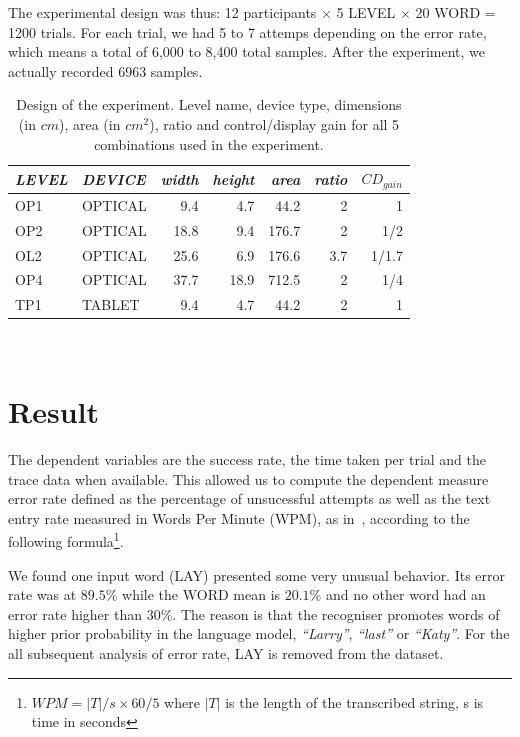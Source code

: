 \documentclass{chi-ext}
\newcommand{\smit}[1]{{\small\textit{{#1}}}}
\newcommand{\cdt}[1]{{\small\uppercase{{#1}}}}
\begin{document}
The experimental design was thus: 12 participants $\times$ 5 \cdt{level} $\times$ 20 \cdt{word} = 1200 trials. For each trial, we had 5 to 7 attemps depending on the error rate, which means a total of 6,000 to 8,400 total samples. After the experiment, we actually recorded 6963 samples.

\begin{table}
  \centering
  \begin{tabular}{l l | r r r r r}
    \smit{LEVEL} & \smit{DEVICE} & \smit{width} & \smit{height} & \smit{area}& \smit{ratio} & \smit{$CD_{gain}$} \\
    \hline
    \cdt{OP1} & \cdt{optical} & 9.4 & 4.7 & 44.2 & 2 & 1 \\
    \cdt{OP2} & \cdt{optical} & 18.8 & 9.4 & 176.7 & 2 & 1/2 \\
    \cdt{OL2} & \cdt{optical} & 25.6 & 6.9 & 176.6 & 3.7 & 1/1.7 \\
    \cdt{OP4} & \cdt{optical} & 37.7 & 18.9 & 712.5 & 2 & 1/4 \\
    \hline
    \cdt{tp1} & \cdt{tablet} & 9.4 & 4.7 & 44.2 & 2 & 1 \\
  \end{tabular}
  \caption{Design of the experiment. Level name, device type, dimensions (in $cm$), area (in $cm^2$), ratio and control/display gain for all 5 combinations used in the experiment.}~\label{tab:cdt}
\end{table}

\section{Result}
The dependent variables are the success rate, the time taken per trial and the trace data when available. This allowed us to compute the dependent measure error rate defined as the percentage of unsucessful attempts as well as the text entry rate measured in Words Per Minute (WPM), as in~\cite{Markussen2014}, according to the following formula\footnote{$WPM = |T|/s \times 60/5$ where $|T|$ is the length of the transcribed string, s is time in seconds}.

We found one input word (\cdt{lay}) presented some very unusual behavior. Its error rate was at $89.5\%$ while the \cdt{WORD} mean is $20.1\%$ and no other word had an error rate higher than $30\%$. The reason is that the recogniser promotes words of higher prior probability in the language model, \textit{``Larry''}, \textit{``last''} or \textit{``Katy''}. For the all subsequent analysis of error rate, \cdt{lay} is removed from the dataset.
\end{document}
